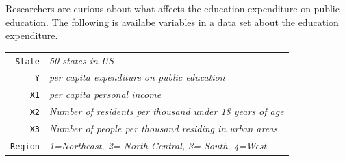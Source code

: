 \documentclass[12pt,letterpaper]{article}
\begin{document}
\noindent Researchers are curious about what affects the education expenditure on public education. The following is availabe variables in a data set about the education expenditure. \\
\vspace{.5cm}


\begin{tabular}{r|l}
	\texttt{State} &\emph{50 states in US} \\
	\texttt{Y} & \emph{per capita expenditure on public education}\\
	\texttt{X1} &\emph{per capita personal income} \\
	\texttt{X2} &  \emph{Number of residents per thousand under 18 years of age}\\
	\texttt{X3} &  \emph{Number of people per thousand residing in urban areas} \\
	\texttt{Region} &  \emph{1=Northeast, 2= North Central, 3= South, 4=West} \\
\end{tabular}
\end{document}
